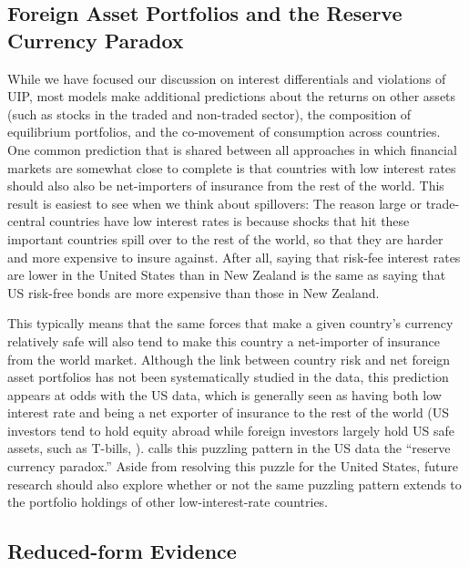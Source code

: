 \documentclass{ar-1col}
\begin{document}
\begin{textbox}[h]
\section{Foreign Asset Portfolios and the Reserve Currency Paradox} While we have focused our discussion on interest differentials and violations of UIP, most models make additional predictions about the returns on other assets (such as stocks in the traded and non-traded sector), the composition of equilibrium portfolios, and the co-movement of consumption across countries. One common prediction that is shared between all approaches in which financial markets are somewhat close to complete is that countries with low interest rates should also also be net-importers of insurance from the rest of the world. This result is easiest to see when we think about spillovers: The reason large or trade-central countries have low interest rates is because shocks that hit these important countries spill over to the rest of the world, so that they are harder and more expensive to insure against. After all, saying that risk-fee interest rates are lower in the United States than in New Zealand is the same as saying that US risk-free bonds are more expensive than those in New Zealand.

This typically means that the same forces that make a given country's currency relatively safe will also tend to make this country a net-importer of insurance from the world market. Although the link between country risk and net foreign asset portfolios has not been systematically studied in the data, this prediction appears at odds with the US data, which is generally seen as having both low interest rate and being a net exporter of insurance to the rest of the world (US investors tend to hold equity abroad while foreign investors largely hold US safe assets, such as T-bills, \citep{GourinchasRey2007,GourinchasGovillotRey2017}). \cite{Maggiori2013} calls this puzzling pattern in the US data the ``reserve currency paradox.'' Aside from resolving this puzzle for the United States, future research should also explore whether or not the same puzzling pattern extends to the portfolio holdings of other low-interest-rate countries. 

\end{textbox}


\subsection{Reduced-form Evidence}
\end{document}
